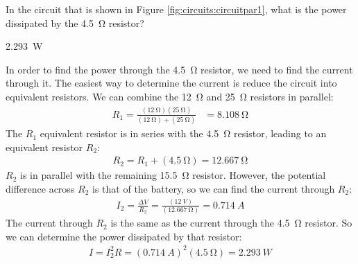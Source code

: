 \question In the circuit that is shown in Figure \ref{fig:circuits:circuitpar1}, what is the power dissipated by the \SI{4.5}{\ohm} resistor?
\begin{finalanswer}
\SI{2.293}{W}
\end{finalanswer}
\begin{solution}
In order to find the power through the \SI{4.5}{\ohm} resistor, we need to find the current through it. The easiest way to determine the current is reduce the circuit into equivalent resistors. We can combine the \SI{12}{\ohm} and \SI{25}{\ohm} resistors in parallel:
\begin{align*}
R_1=\frac{(\SI{12}{\ohm})(\SI{25}{\ohm})}{(\SI{12}{\ohm})+(\SI{25}{\ohm})}&=\SI{8.108}{\ohm}
\end{align*}
The $R_1$ equivalent resistor is in series with the \SI{4.5}{\ohm} resistor, leading to an equivalent resistor $R_2$:
\begin{align*}
R_2=R_1+(\SI{4.5}{\ohm})=\SI{12.667}{\ohm}
\end{align*}
$R_2$ is in parallel with the remaining \SI{15.5}{\ohm} resistor. However, the potential difference across $R_2$ is that of the battery, so we can find the current through $R_2$:
\begin{align*}
I_2=\frac{\Delta V}{R_2}=\frac{(\SI{12}{V})}{(\SI{12.667}{\ohm})}=\SI{0.714}{A}
\end{align*}
The current through $R_2$ is the same as the current through the \SI{4.5}{\ohm} resistor. So we can determine the power dissipated by that resistor:
\begin{align*}
I=I_2^2R=(\SI{0.714}{A})^2(\SI{4.5}{\ohm})=\SI{2.293}{W}
\end{align*}
\end{solution}

